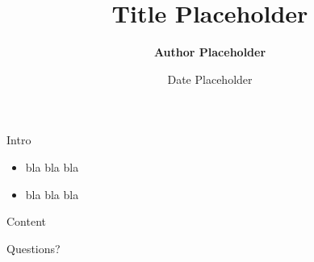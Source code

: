 \documentclass[aspectratio=169, xcolor=dvipsnames, 11pt]{beamer}
\title[]{Title Placeholder}
\author{\textbf{Author Placeholder}}
\institute{\scriptsize Institute Placeholder}
\date{Date Placeholder}
\begin{document}
\begin{frame}[plain] %
  \titlepage
\end{frame}

\begin{frame}{Intro}
  \begin{itemize}
    \item bla bla bla
    \item bla bla bla
  \end{itemize}
\end{frame}

\begin{frame}{Content}
    
\end{frame}

\begin{frame}[standout]
Questions?
\end{frame}
\end{document}
